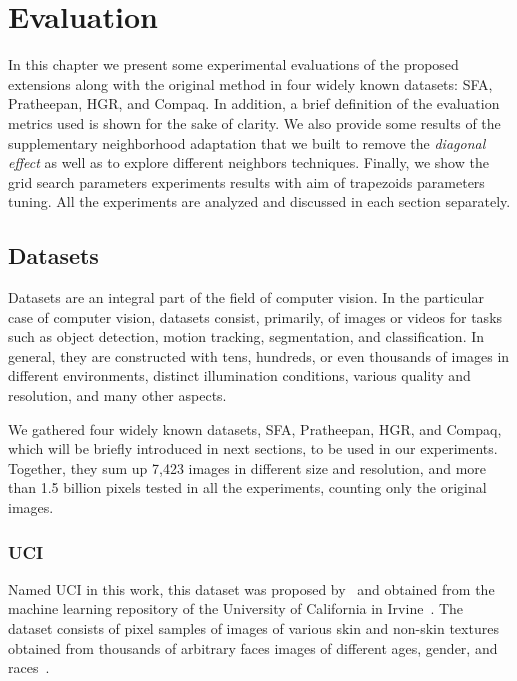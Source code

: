 \chapter{Evaluation}
\label{cap:experimentos}

In this chapter we present some experimental evaluations of the proposed extensions along with the original method in four widely known datasets: SFA, Pratheepan, HGR, and Compaq. In addition, a brief definition of the evaluation metrics used is shown for the sake of clarity. We also provide some results of the supplementary neighborhood adaptation that we built to remove the \emph{diagonal effect} as well as to explore different neighbors techniques. Finally, we show the grid search parameters experiments results with aim of trapezoids parameters tuning. All the experiments are analyzed and discussed in each section separately.


\section{Datasets}
\label{sec:datasets}
Datasets are an integral part of the field of computer vision. In the particular case of computer vision, datasets consist, primarily, of images or videos for tasks such as object detection, motion tracking, segmentation, and classification. In general, they are constructed with tens, hundreds, or even thousands of images in different environments, distinct illumination conditions, various quality and resolution, and many other aspects.

We gathered four widely known datasets, SFA, Pratheepan, HGR, and Compaq, which will be briefly introduced in next sections, to be used in our experiments. Together, they sum up 7,423 images in different size and resolution, and more than 1.5 billion pixels tested in all the experiments, counting only the original images.


\subsection{UCI}
\label{sec:datasets_uci}
Named UCI in this work, this dataset was proposed by~\citet{uci-skin-dataset:12} and obtained from the machine learning repository of the University of California in Irvine~\citep{lichman:13}. The dataset consists of pixel samples of images of various skin and non-skin textures obtained from thousands of arbitrary faces images of different ages, gender, and races~\citep{pal-texas:04, feret:96}.

